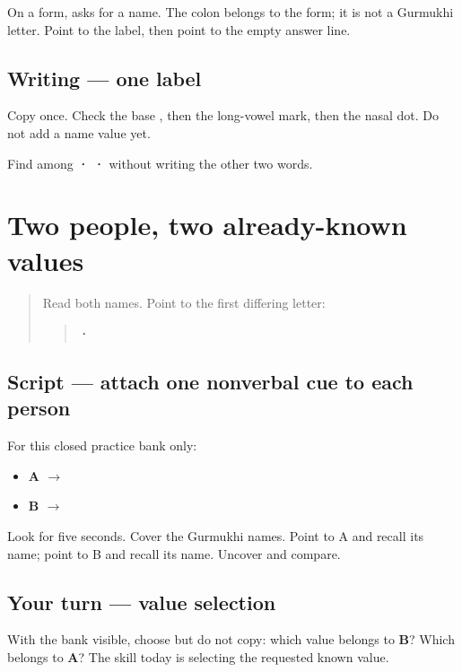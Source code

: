 On a form, \textbf{} asks for a name. The colon belongs to the form; it is not a Gurmukhi letter. Point to the label, then point to the empty answer line.

\subsection*{Writing — one label}
Copy \textbf{} once. Check the base \textbf{}, then the long-vowel mark, then the nasal dot. Do not add a name value yet.

\begin{tcolorbox}[breakable,colback=teal!4,colframe=teal!35!black,title={Before you move on}]
Find \textbf{} among \textbf{ ·  · } without writing the other two words.
\end{tcolorbox}
\section[\texorpdfstring{A \pa{ਅਮਨ} · B \pa{ਮਨਨ} (Aman; Manan)}{A ਅਮਨ · B ਮਨਨ (Aman; Manan)}]{Two people, two already-known values}

\label{lesson:PA-W02-name-select}



\begin{quote}
Read both names. Point to the first differing letter:

\begin{quote}
\textbf{ · }
\end{quote}
\end{quote}

\subsection*{Script — attach one nonverbal cue to each person}
For this closed practice bank only:

\begin{itemize}
\raggedright
  \item \textbf{A $\to$ }
  \item \textbf{B $\to$ }
\end{itemize}

Look for five seconds. Cover the Gurmukhi names. Point to A and recall its name; point to B and recall its name. Uncover and compare.

\subsection*{Your turn — value selection}
With the bank visible, choose but do not copy: which value belongs to \textbf{B}? Which belongs to \textbf{A}? The skill today is selecting the requested known value.

